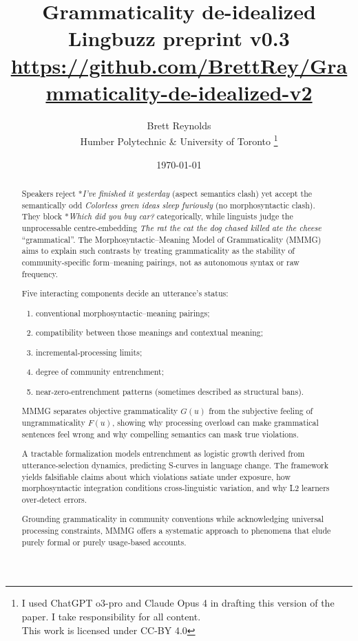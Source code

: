 \documentclass[12pt]{article}
\title{Grammaticality de-idealized\\[4pt]
       \large Lingbuzz preprint v0.3\\[6pt]
       \normalsize \url{https://github.com/BrettRey/Grammaticality-de-idealized-v2}}
\author{Brett Reynolds \orcidlink{0000-0003-0073-7195}\\Humber Polytechnic \& University of Toronto
\thanks{I used ChatGPT o3-pro and Claude Opus 4 in drafting this version of the paper. I take responsibility for all content. \\This work is licensed under CC-BY 4.0}}
\date{\today}
\begin{document}
\maketitle

\begin{abstract}
\small
Speakers reject *\textit{I've finished it yesterday} (aspect semantics clash) yet accept the semantically odd \textit{Colorless green ideas sleep furiously} (no morphosyntactic clash). They block *\textit{Which did you buy car?} categorically, while linguists judge the unprocessable centre‑embedding \textit{The rat the cat the dog chased killed ate the cheese} \enquote{grammatical}.  
The Morphosyntactic–Meaning Model of Grammaticality (MMMG) aims to explain such contrasts by treating grammaticality as the stability of community‑specific form–meaning pairings, not as autonomous syntax or raw frequency.

Five interacting components decide an utterance's status:  
\begin{enumerate}
    \item conventional morphosyntactic--meaning pairings;  
    \item compatibility between those meanings and contextual meaning;  
    \item incremental‑processing limits;  
    \item degree of community entrenchment;  
    \item near-zero-entrenchment patterns (sometimes described as structural bans).
\end{enumerate}

MMMG separates objective grammaticality \(G(u)\) from the subjective feeling of ungrammaticality \(F(u)\), showing why processing overload can make grammatical sentences feel wrong and why compelling semantics can mask true violations.  

A tractable formalization models entrenchment as logistic growth derived from utterance-selection dynamics, predicting S‑curves in language change. The framework yields falsifiable claims about which violations satiate under exposure, how morphosyntactic integration conditions cross‑linguistic variation, and why L2 learners over‑detect errors.  

Grounding grammaticality in community conventions while acknowledging universal processing constraints, MMMG offers a systematic approach to phenomena that elude purely formal or purely usage‑based accounts.
\end{abstract}
\end{document}
